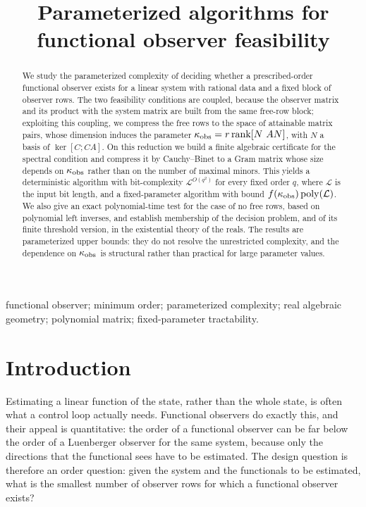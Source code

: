 \documentclass[journal]{IEEEtran}
\theoremstyle{plainn}
\begin{document}
\title{Parameterized algorithms for functional observer feasibility}
\author{}
\maketitle

\begin{abstract}
We study the parameterized complexity of deciding whether a prescribed-order functional
observer exists for a linear system with rational data and a fixed block of observer rows.
The two feasibility conditions are coupled, because the observer matrix and its product
with the system matrix are built from the same free-row block; exploiting this coupling, we
compress the free rows to the space of attainable matrix pairs, whose dimension induces the
parameter $\kappa_{\rm obs}=r\operatorname{rank}[N\ AN]$, with $N$ a basis of
$\ker[C;CA]$. On this reduction we build a finite algebraic certificate for the spectral
condition and compress it by Cauchy--Binet to a Gram matrix whose size depends on
$\kappa_{\rm obs}$ rather than on the number of maximal minors. This yields a deterministic
algorithm with bit-complexity $\mathcal L^{O(q^2)}$ for every fixed order $q$, where
$\mathcal L$ is the input bit length, and a fixed-parameter algorithm with bound
$f(\kappa_{\rm obs})\operatorname{poly}(\mathcal L)$. We also give an exact
polynomial-time test for the case of no free rows, based on polynomial left inverses, and
establish membership of the decision problem, and of its finite threshold version, in the
existential theory of the reals. The results are parameterized upper bounds: they do not
resolve the unrestricted complexity, and the dependence on $\kappa_{\rm obs}$ is structural
rather than practical for large parameter values.
\end{abstract}

\begin{IEEEkeywords}
functional observer; minimum order; parameterized complexity; real algebraic geometry; polynomial matrix; fixed-parameter tractability.
\end{IEEEkeywords}

\section{Introduction}\label{sec:intro}

Estimating a linear function of the state, rather than the whole state, is often what a
control loop actually needs. Functional observers do exactly this, and their appeal is
quantitative: the order of a functional observer can be far below the order of a
Luenberger observer for the same system, because only the directions that the functional
sees have to be estimated. The design question is therefore an order question: given the
system and the functionals to be estimated, what is the smallest number of observer rows
for which a functional observer exists?
\end{document}
